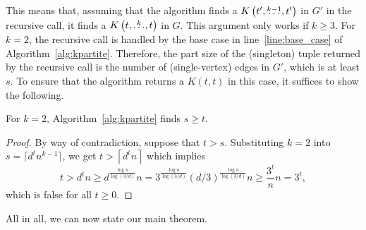 This means that, assuming that the algorithm finds a $K\left(t', \overset{k-1}{\dots}, t'\right)$ in $G'$ in the recursive call,
it finds a $K\left(t, \overset{k}{\dots}, t\right)$ in $G$.
This argument only works if $k \geq 3$.
For $k=2$, the recursive call is handled by the base case in
line~\ref{line:base_case} of Algorithm~\ref{alg:kpartite}.
Therefore, the part size of the (singleton) tuple returned by the recursive call
is the number of (single-vertex) edges in $G'$, which is at least $s$.
To ensure that the algorithm returns a $K(t, t)$ in this case,
it suffices to show the following.

\begin{lemma}\label{lm:base_case}
    For $k=2$, Algorithm~\ref{alg:kpartite} finds $s \geq t$.
    \begin{proof}
        By way of contradiction, suppose that $t > s$.
        Substituting $k=2$ into $s = \lceil d^t n^{k-1} \rceil$, we get
        $t > \left\lceil d^t n \right\rceil$ which implies
        \[
            t >
            d^t n \geq
            d^{\frac{\log n}{\log (3/d)}} n =
            3^{\frac{\log n}{\log (3/d)}}(d/3)^{\frac{\log n}{\log (3/d)}} n \geq
            \frac{3^t}{n} n =
            3^t,
        \]
        which is false for all $t \geq 0$.
    \end{proof}
\end{lemma}

All in all, we can now state our main theorem.

